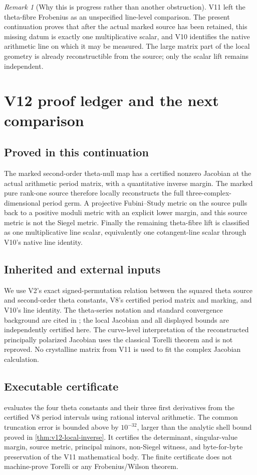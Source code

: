 \documentclass[11pt]{article}
\theoremstyle{definition}
\theoremstyle{remark}
\newtheorem{remark}[remark]{Remark}
\begin{document}
\begin{remark}[Why this is progress rather than another obstruction]
V11 left the theta-fibre Frobenius as an unspecified line-level comparison.
The present continuation proves that after the actual marked source has been
retained, this missing datum is exactly one multiplicative scalar, and V10
identifies the native arithmetic line on which it may be measured.  The large
matrix part of the local geometry is already reconstructible from the source;
only the scalar lift remains independent.
\end{remark}

\section{V12 proof ledger and the next comparison}
\label{sec:v12-status}

\subsection{Proved in this continuation}
The marked second-order theta-null map has a certified nonzero Jacobian at the
actual arithmetic period matrix, with a quantitative inverse margin.  The
marked pure rank-one source therefore locally reconstructs the full
three-complex-dimensional period germ.  A projective Fubini--Study metric on
the source pulls back to a positive moduli metric with an explicit lower
margin, and this source metric is not the Siegel metric.  Finally the remaining
theta-fibre lift is classified as one multiplicative line scalar, equivalently
one cotangent-line scalar through V10's native line identity.

\subsection{Inherited and external inputs}
We use V2's exact signed-permutation relation between the squared theta source
and second-order theta constants, V8's certified period matrix and marking,
and V10's line identity.  The theta-series notation and standard convergence
background are cited in \cite{DLMFTheta}; the local Jacobian and all displayed
bounds are independently certified here.  The curve-level interpretation of
the reconstructed principally polarized Jacobian uses the classical Torelli
theorem and is not reproved.  No crystalline matrix from V11 is used to fit the
complex Jacobian calculation.

\subsection{Executable certificate}
 evaluates the
four theta constants and their three first derivatives from the certified V8
period intervals using rational interval arithmetic.  The common truncation
error is bounded above by \(10^{-32}\), larger than the analytic shell bound
proved in \cref{thm:v12-local-inverse}.  It certifies the determinant,
singular-value margin, source metric, principal minors, non-Siegel witness,
and byte-for-byte preservation of the V11 mathematical body.  The finite
certificate does not machine-prove Torelli or any Frobenius/Wilson theorem.
\end{document}
